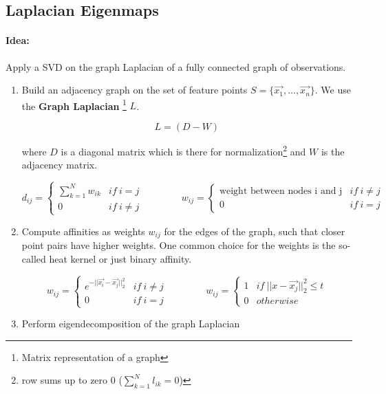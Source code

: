 
\subsection*{Laplacian Eigenmaps}

\paragraph{Idea:} Apply a SVD on the graph Laplacian of a fully connected graph of observations.

\begin{enumerate}
    \item Build an adjacency graph on the set of feature points \(S=\{\vec{x_1}, \dots, \vec{x_n}\}\). We use the \textbf{Graph Laplacian} \footnote{Matrix representation of a graph} $L$.

      \[L = (D - W)\]

      where \(D\) is a diagonal matrix which is there for normalization\footnote{row sums up to zero \(0\) (\(\sum_{k=1}^N l_{ik} = 0\))} and \(W\) is the adjacency matrix.

      \[d_{ij} = \begin{cases} \sum_{k=1}^N w_{ik} & if \ i=j \\ 0 & if \ i \neq j \end{cases}
        \qquad \qquad w_{ij} = \begin{cases} \text{weight between nodes i and j} & if \ i\neq j \\ 0 & if \ i = j\end{cases}\]

    \item Compute affinities as weights \(w_{ij}\) for the edges of the graph, such that closer point pairs have higher weights. One common choice for the weights is the so-called heat kernel or just binary affinity.

      \[w_{ij} = \begin{cases} e^{-||\vec{x_i} - \vec{x_j}||_2^2}  & if \ i\neq j \\ 0 & if \ i = j\end{cases}
        \qquad \qquad w_{ij} = \begin{cases} 1 & if \ ||x-\vec{x_j}||_2^2 \leq t \\ 0 & otherwise \end{cases}\]

    \item Perform eigendecomposition of the graph Laplacian


\end{enumerate}

